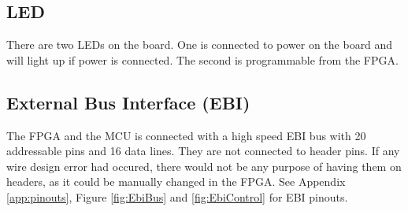 \subsection{LED}
There are two LEDs on the board.
One is connected to power on the board and will light up if power is connected.
The second is programmable from the FPGA.

\subsection{External Bus Interface (EBI)}
The FPGA and the MCU is connected with a high speed EBI bus with 20 addressable pins and 16 data lines.
They are not connected to header pins.
If any wire design error had occured, there would not be any purpose of having them on headers, as it could be manually changed in the FPGA.
See Appendix \ref{app:pinouts}, Figure \ref{fig:EbiBus} and \ref{fig:EbiControl} for EBI pinouts.

